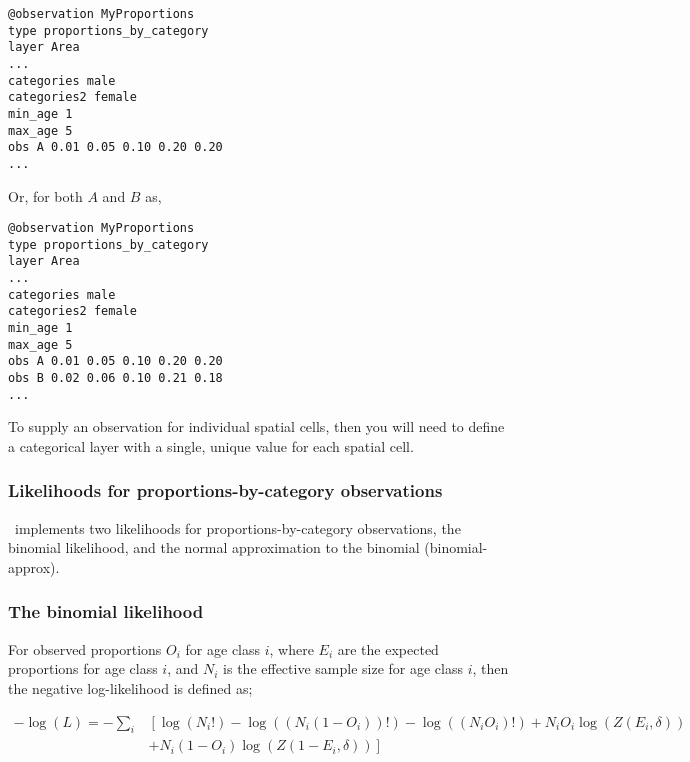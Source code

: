 {{{{{{{\small{\begin{verbatim}
@observation MyProportions
type proportions_by_category
layer Area
...
categories male 
categories2 female
min_age 1
max_age 5
obs A 0.01 0.05 0.10 0.20 0.20
...
\end{verbatim}}}

Or, for both $A$ and $B$ as,

{\small{\begin{verbatim}
@observation MyProportions
type proportions_by_category
layer Area
...
categories male
categories2 female
min_age 1
max_age 5
obs A 0.01 0.05 0.10 0.20 0.20
obs B 0.02 0.06 0.10 0.21 0.18
...
\end{verbatim}}}

To supply an observation for individual spatial cells, then you will need to define a categorical layer with a single, unique value for each spatial cell. 

\subsubsection{Likelihoods for proportions-by-category observations}

\iSAM\ implements two likelihoods for proportions-by-category observations, the binomial likelihood, and the normal approximation to the binomial (binomial-approx). 

\subsubsection*{The binomial likelihood}

For observed proportions $O_i$ for age class $i$, where $E_i$ are the expected proportions for age class $i$, and $N_i$ is the effective sample size for age class $i$, then the negative log-likelihood is defined as;  

\begin{equation}
  \begin{split}
    -\log \left(L \right)= -\sum\limits_i & \left[ \right. \log \left(N_i! \right) - \log \left(\left(N_i \left(1 - O_i \right) \right)! \right) - \log \left(\left(N_i O_i \right)! \right) + N_i O_i \log \left(Z\left(E_i,\delta \right) \right) \\
    &+ N_i \left(1 - O_i \right)\log \left(Z\left(1 - E_i,\delta\right) \right) \left. \right]
  \end{split}
\end{equation}


}}}}}}
